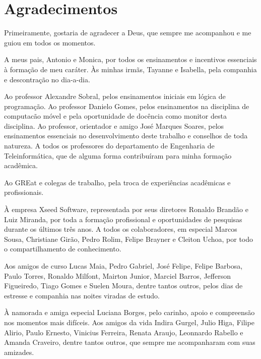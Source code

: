 \chapter*{Agradecimentos}
\label{chp:agrad}%
Primeiramente, gostaria de agradecer a Deus, que sempre me acompanhou e me guiou em todos os momentos.

A meus pais, Antonio e Monica, por todos os ensinamentos e incentivos essenciais à formação de meu caráter. Às minhas irmãs, Tayanne e Isabella, pela companhia e descontração no dia-a-dia.

Ao professor Alexandre Sobral, pelos ensinamentos iniciais em lógica de programação. Ao professor Danielo Gomes, pelos ensinamentos na disciplina de computacão móvel e pela oportunidade de docência como monitor desta disciplina. Ao professor, orientador e amigo José Marques Soares, pelos ensinamentos essenciais no desenvolvimento deste trabalho e conselhos de toda natureza. A todos os professores do departamento de Engenharia de Teleinformática, que de alguma forma contribuíram para minha formação acadêmica.

Ao GREat e colegas de trabalho, pela troca de experiências acadêmicas e profissionais.

À empresa Xseed Software, representada por seus diretores Ronaldo Brandão e Luiz Miranda, por toda a formação profissional e oportunidades de pesquisas durante os últimos três anos. A todos os colaboradores, em especial Marcos Sousa, Christiane Girão, Pedro Rolim, Felipe Brayner e Cleiton Uchoa, por todo o compartilhamento de conhecimento.

Aos amigos de curso Lucas Maia, Pedro Gabriel, José Felipe, Felipe Barbosa, Paulo Torres, Ronaldo Milfont, Mairton Junior, Marciel Barros, Jefferson Figueiredo, Tiago Gomes e Suelen Moura, dentre tantos outros, pelos dias de estresse e companhia nas noites viradas de estudo.

À namorada e amiga especial Luciana Borges, pelo carinho, apoio e compreensão nos momentos mais difíceis. Aos amigos da vida Indira Gurgel, Julio Higa, Filipe Alirio, Paulo Ernesto, Vinicius Ferreira, Renata Araujo, Leonnardo Rabello e Amanda Craveiro, dentre tantos outros, que sempre me acompanharam com suas amizades.
